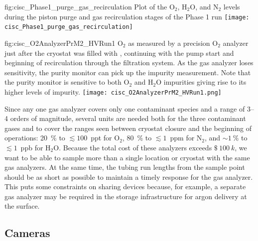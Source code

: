\begin{dunefigure}{fig:cisc_Phase1_purge_gas_recirculation}
  {Plot of the $\text{O}_2$, $\text{H}_2\text{O}$, and $\text{N}_2$ levels during the piston purge and gas recirculation stages of the  Phase 1 run}
  \texttt{[image: cisc\_Phase1\_purge\_gas\_recirculation]}
\end{dunefigure}

\begin{dunefigure}{fig:cisc_O2AnalyzerPrM2_HVRun1}
  {$\text{O}_2$ as measured by a precision $\text{O}_2$ analyzer just after the  cryostat was filled with , continuing with the  pump start and beginning of  recirculation through the filtration system. As the gas analyzer loses sensitivity, the purity monitor can pick up the impurity measurement. Note that the purity monitor is sensitive to both $\text{O}_2$ and $\text{H}_2\text{O}$ impurities giving rise to its higher levels of impurity.}
  \texttt{[image: cisc\_O2AnalyzerPrM2\_HVRun1.png]}
\end{dunefigure}

Since any one gas analyzer covers only one contaminant species and a range of \numrange{3}{4} orders of magnitude, several units are needed both for the three contaminant gases and to cover the ranges seen between  cryostat closure and the beginning of  operations:
\SI{20}{\percent} to $\lesssim 100$~ppt for $\text{O}_2$,
\SI{80}{\percent} to $\lesssim 1$~ppm for $\text{N}_2$, and
$\sim \SI{1}{\percent}$ to $\lesssim 1$~ppb for $\text{H}_2\text{O}$.
Because the total cost of these analyzers exceeds $\SI{100}[\mathdollar]{k}$, we want to be able to  sample more than a single location or cryostat with the same gas analyzers. At the same time, the tubing run lengths from the sample point should be as short as possible to maintain a timely response for the gas analyzer. This puts some constraints on sharing devices because, for example, 
a separate gas analyzer may be required in the storage infrastructure for argon delivery at the surface.


\subsection{Cameras}

